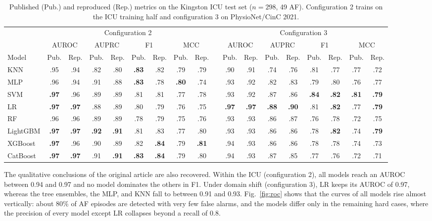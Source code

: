 \documentclass[conference,a4paper]{IEEEtran}
\begin{document}
\begin{table}[t]
\centering
\caption{Published (Pub.) and reproduced (Rep.) metrics on the Kingston ICU test set ($n = 298$, 49 AF). Configuration 2 trains on the ICU training half and configuration 3 on PhysioNet/CinC 2021.}
\label{tab:repro}
\begin{tabular}{l cc cc cc cc c cc cc cc cc}
\toprule
& \multicolumn{8}{c}{Configuration 2} && \multicolumn{8}{c}{Configuration 3} \\
\cmidrule{2-9}\cmidrule{11-18}
& \multicolumn{2}{c}{AUROC} & \multicolumn{2}{c}{AUPRC} & \multicolumn{2}{c}{F1} & \multicolumn{2}{c}{MCC} && \multicolumn{2}{c}{AUROC} & \multicolumn{2}{c}{AUPRC} & \multicolumn{2}{c}{F1} & \multicolumn{2}{c}{MCC} \\
Model & Pub. & Rep. & Pub. & Rep. & Pub. & Rep. & Pub. & Rep. && Pub. & Rep. & Pub. & Rep. & Pub. & Rep. & Pub. & Rep. \\
\midrule
KNN       & .95 & .94 & .82 & .80 & \textbf{.83} & .82 & .79 & .79 &  & .90 & .91 & .74 & .76 & .81 & .77 & .77 & .72 \\
MLP      & .96 & .94 & .91 & .88 & \textbf{.83} & .78 & \textbf{.80} & .74 &  & .93 & .92 & .82 & .83 & .79 & .80 & .76 & .77 \\
SVM      & \textbf{.97} & .96 & .89 & .89 & .81 & .81 & .77 & .78 &  & .93 & .92 & .87 & .86 & \textbf{.84} & \textbf{.82} & \textbf{.81} & \textbf{.79} \\
LR       & \textbf{.97} & \textbf{.97} & .88 & .89 & .80 & .79 & .76 & .75 &  & \textbf{.97} & \textbf{.97} & \textbf{.88} & \textbf{.90} & .81 & \textbf{.82} & .77 & \textbf{.79} \\
RF       & .96 & .96 & .89 & .89 & .78 & .79 & .75 & .76 &  & .93 & .93 & .86 & .87 & .76 & .78 & .72 & .75 \\
LightGBM & \textbf{.97} & \textbf{.97} & \textbf{.92} & \textbf{.91} & .81 & .83 & .77 & .80 &  & .93 & .93 & .86 & .86 & .78 & \textbf{.82} & .74 & \textbf{.79} \\
XGBoost  & \textbf{.97} & .96 & .90 & .89 & .82 & \textbf{.84} & .79 & \textbf{.81} &  & .94 & .93 & .86 & .86 & .78 & .78 & .74 & .73 \\
CatBoost & \textbf{.97} & \textbf{.97} & .91 & \textbf{.91} & \textbf{.83} & \textbf{.84} & .79 & .80 &  & .94 & .93 & .87 & .85 & .77 & .76 & .72 & .71 \\
\bottomrule
\end{tabular}
\end{table}

The qualitative conclusions of the original article are also recovered. Within the ICU (configuration 2), all models reach an AUROC between 0.94 and 0.97 and no model dominates the others in F1. Under domain shift (configuration 3), LR keeps its AUROC of 0.97, whereas the tree ensembles, the MLP, and KNN fall to between 0.91 and 0.93. Fig.~\ref{fig:roc} shows that the curves of all models rise almost vertically: about 80\% of AF episodes are detected with very few false alarms, and the models differ only in the remaining hard cases, where the precision of every model except LR collapses beyond a recall of 0.8.
\end{document}
